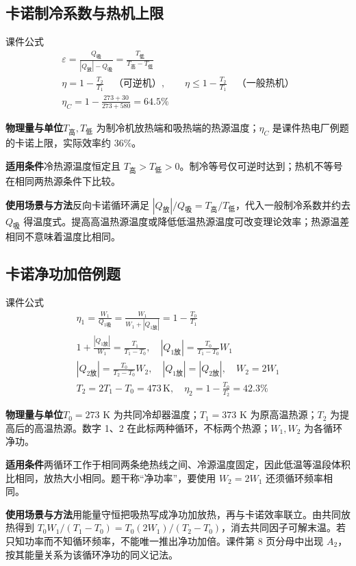 \documentclass[UTF8,fontset=none,zihao=-4,a4paper]{ctexart}
\newcommand{\unit}[1]{\,\mathrm{#1}}
\newcommand{\explain}[3]{\par\noindent\textbf{物理量与单位}\quad #1\par
\noindent\textbf{适用条件}\quad #2\par
\noindent\textbf{使用场景与方法}\quad #3\par}
\begin{document}
\par\noindent\begin{minipage}{\linewidth}
\subsection{卡诺制冷系数与热机上限}
\begin{infobox}[breakable=false]{课件公式}
\begin{gather*}\varepsilon=\frac{Q_{\text{吸}}}{|Q_{\text{放}}|-Q_{\text{吸}}}=\frac{T_{\text{低}}}{T_{\text{高}}-T_{\text{低}}}\\\eta=1-\frac{T_2}{T_1}\quad\text{（可逆机）},\qquad\eta\le1-\frac{T_2}{T_1}\quad\text{（一般热机）}\\\eta_C=1-\frac{273+30}{273+580}=64.5\%\end{gather*}
\end{infobox}
\end{minipage}\par
\explain{$T_{\text{高}},T_{\text{低}}$ 为制冷机放热端和吸热端的热源温度；$\eta_C$ 是课件热电厂例题的卡诺上限，实际效率约 36\%。}{冷热源温度恒定且 $T_{\text{高}}>T_{\text{低}}>0$。制冷等号仅可逆时达到；热机不等号在相同两热源条件下比较。}{反向卡诺循环满足 $|Q_{\text{放}}|/Q_{\text{吸}}=T_{\text{高}}/T_{\text{低}}$，代入一般制冷系数并约去 $Q_{\text{吸}}$ 得温度式。提高高温热源温度或降低低温热源温度可改变理论效率；热源温差相同不意味着温度比相同。}


\par\noindent\begin{minipage}{\linewidth}
\subsection{卡诺净功加倍例题}
\begin{infobox}[breakable=false]{课件公式}
\begin{gather*}\eta_1=\frac{W_1}{Q_{1\text{吸}}}=\frac{W_1}{W_1+|Q_{1\text{放}}|}=1-\frac{T_0}{T_1}\\1+\frac{|Q_{1\text{放}}|}{W_1}=\frac{T_1}{T_1-T_0},\quad |Q_{1\text{放}}|=\frac{T_0}{T_1-T_0}W_1\\|Q_{2\text{放}}|=\frac{T_0}{T_2-T_0}W_2,\quad |Q_{1\text{放}}|=|Q_{2\text{放}}|,\quad W_2=2W_1\\T_2=2T_1-T_0=473\unit K,\quad\eta_2=1-\frac{T_0}{T_2}=42.3\%\end{gather*}
\end{infobox}
\end{minipage}\par
\explain{$T_0=273$ K 为共同冷却器温度；$T_1=373$ K 为原高温热源；$T_2$ 为提高后的高温热源。数字 1、2 在此标两种循环，不标两个热源；$W_1,W_2$ 为各循环净功。}{两循环工作于相同两条绝热线之间、冷源温度固定，因此低温等温段体积比相同，放热大小相同。题干称“净功率”，要使用 $W_2=2W_1$ 还须循环频率相同。}{用能量守恒把吸热写成净功加放热，再与卡诺效率联立。由共同放热得到 $T_0W_1/(T_1-T_0)=T_0(2W_1)/(T_2-T_0)$，消去共同因子可解末温。若只知功率而不知循环频率，不能唯一推出净功加倍。课件第 8 页分母中出现 $A_2$，按其能量关系为该循环净功的同义记法。}
\end{document}
